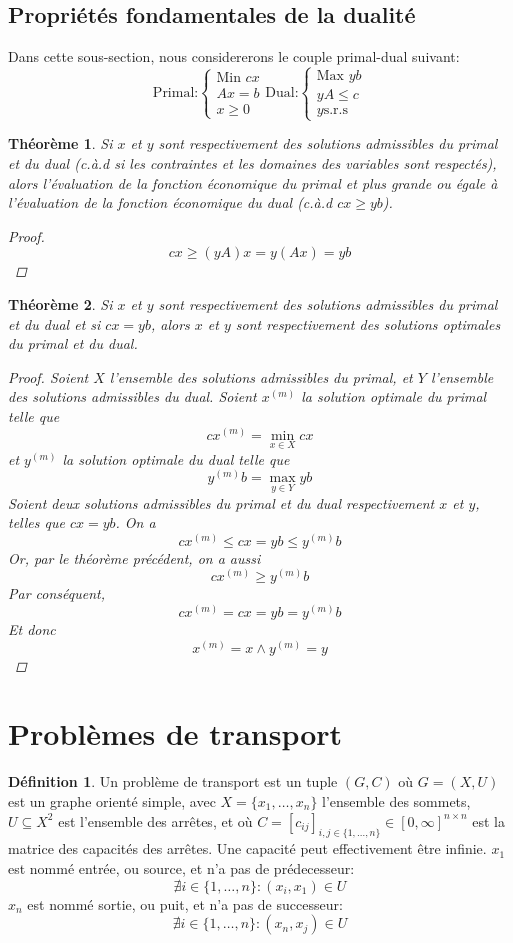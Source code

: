 \documentclass[a4paper]{report}
\theoremstyle{definition}
\newtheorem*{definition}{Définition}
\theoremstyle{remark}
\theoremstyle{plain}
\newtheorem{theorem}{Théorème}
\begin{document}
\subsection{Propriétés fondamentales de la dualité}
Dans cette sous-section, nous considererons le couple primal-dual suivant:
\[\text{Primal:}
\begin{cases}
	\text{Min } cx \\
	Ax=b \\
	x \ge 0
\end{cases}
\text{Dual:}\begin{cases}
\text{Max } yb\\
yA\le c\\
y\text{s.r.s}
\end{cases}\]

\begin{theorem}
Si \(x\) et \(y\) sont respectivement des solutions admissibles du primal et du
dual (c.à.d si les contraintes et les domaines des variables sont respectés),
alors l'évaluation de la fonction économique du primal et plus grande ou
égale à l'évaluation de la fonction économique du dual (c.à.d \(cx\ge yb\)).
\begin{proof}
\[cx\ge (yA)x=y(Ax)=yb\]
\end{proof}
\end{theorem}

\begin{theorem}
Si \(x\) et \(y\) sont respectivement des solutions admissibles du primal et du
dual et si \(cx=yb\), alors \(x\) et \(y\) sont respectivement des solutions
optimales du primal et du dual.
\begin{proof}
Soient \(X\) l'ensemble des solutions admissibles du primal, et \(Y\) l'ensemble
des solutions admissibles du dual. Soient \(x^{(m)}\) la solution optimale du
primal telle que
\[cx^{(m)}=\min_{x\in X}cx\]
et \(y^{(m)}\) la solution optimale du dual telle que
\[y^{(m)}b=\max_{y\in Y}yb\]
Soient deux solutions admissibles du primal et du dual respectivement \(x\) et
\(y\), telles que \(cx=yb\). On a
\[cx^{(m)}\le cx=yb\le y^{(m)}b\]
Or, par le théorème précédent, on a aussi
\[cx^{(m)}\ge y^{(m)}b\]
Par conséquent,
\[cx^{(m)}=cx=yb=y^{(m)}b\]
Et donc
\[x^{(m)}=x\land y^{(m)}=y\]
\end{proof}
\end{theorem}

\section{Problèmes de transport}
\begin{definition}
Un problème de transport est un tuple \((G,C)\) où \(G=(X,U)\) est un graphe
orienté simple, avec \(X=\{x_1,\dots,x_n\}\) l'ensemble des sommets,
\(U\subseteq X^2\) est l'ensemble des arrêtes, et où
\(C=[c_{ij}]_{i,j\in\{1,\dots,n\}}\in [0,\infty]^{n\times n}\) est la matrice
des capacités des arrêtes. Une capacité peut effectivement être infinie.
\(x_1\) est nommé entrée, ou source, et n'a pas de prédecesseur:
\[\nexists i\in\{1,\dots,n\}:(x_i,x_1)\in U\]
\(x_n\) est nommé sortie, ou puit, et n'a pas de successeur:
\[\nexists i\in\{1,\dots,n\}:(x_n,x_j)\in U\]
\end{definition}
\end{document}
